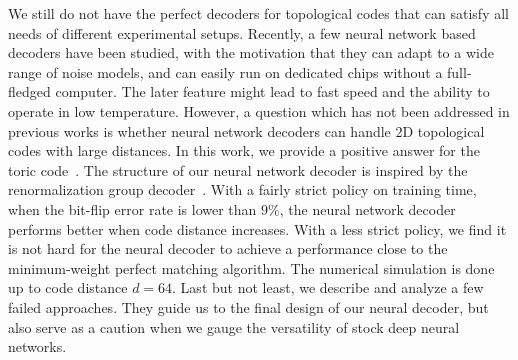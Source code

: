 We still do not have the perfect decoders for topological codes that can satisfy all needs of different experimental setups.
Recently, a few neural network based decoders have been studied, with the motivation that they can adapt to a wide range of noise models, and can easily run on dedicated chips without a full-fledged computer.
The later feature might lead to fast speed and the ability to operate in low temperature.
However, a question which has not been addressed in previous works is whether neural network decoders can handle 2D topological codes with large distances.
In this work, we provide a positive answer for the toric code~\cite{Kitaev2003Faulttolerantanyon}.
The structure of our neural network decoder is inspired by the renormalization group decoder~\cite{duclos2010fast,duclos2013fault}.
With a fairly strict policy on training time, when the bit-flip error rate is lower than $9\%$, the neural network decoder performs better when code distance increases.
With a less strict policy, we find it is not hard for the neural decoder to achieve a performance close to the minimum-weight perfect matching algorithm.
The numerical simulation is done up to code distance $d=64$.
Last but not least, we describe and analyze a few failed approaches.
They guide us to the final design of our neural decoder, but also serve as a caution when we gauge the versatility of stock deep neural networks.